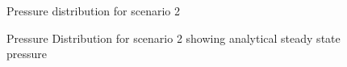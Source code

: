 \documentclass[12pt,letterpaper,titlepage]{article}
\begin{document}
\begin{figure}[p]
\centering
{}
\caption{\label{fig:num}Pressure distribution for scenario 2}
\end{figure}
\begin{figure}[p]
\caption{\label{fig:numanal}Pressure Distribution for scenario 2 showing analytical steady state pressure}
\end{figure}
\end{document}
